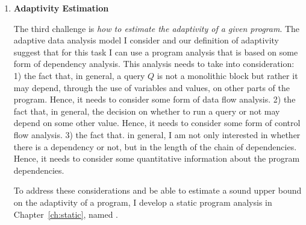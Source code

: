 \begin{enumerate}
\item 
\textbf{Adaptivity Estimation}

The third challenge is \emph{how to estimate the adaptivity of a given program}. 
The adaptive data analysis model I consider and our definition of adaptivity suggest that for this task 
I can use a program analysis that is based on some form of dependency analysis.
 This analysis needs to take into consideration:
1) the fact that, in general, a query $Q$ is not a monolithic block but rather it may depend, through the use of variables and values, on other parts of the program. 
Hence, it needs to consider some form of data flow analysis. 
2) the fact that, in general, the decision on whether to run a query or not may depend on some other value. Hence, 
 it needs to consider some form of control flow analysis.
3) the fact that. in general, I am not only interested in whether there is a dependency or not, but in the length of the chain of dependencies. 
Hence, it needs to consider some quantitative information about the program dependencies. %

To address these considerations and be able to estimate a sound upper bound on the adaptivity of a program, 
I develop a static program analysis in Chapter~\ref{ch:static}, named {\THESYSTEM}.
\end{enumerate}
%

